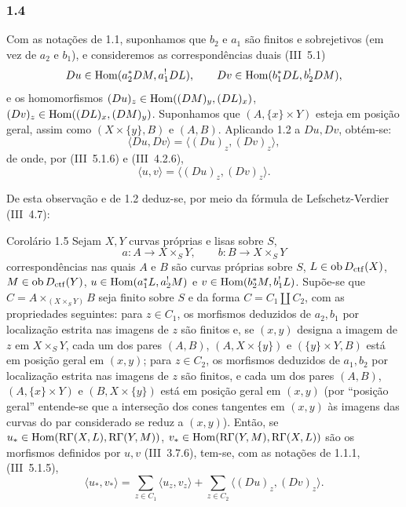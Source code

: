 \subsubsection*{1.4}
Com as notações de 1.1, suponhamos que $b_2$ e $a_1$ são finitos e sobrejetivos (em vez de $a_2$ e $b_1$), e consideremos as correspondências duais (III~5.1)
\[
Du\in\operatorname{Hom}(a_2^*DM,a_1^!DL),\qquad Dv\in\operatorname{Hom}(b_1^*DL,b_2^!DM),
\]
e os homomorfismos $(Du)_z\in\operatorname{Hom}((DM)_y,(DL)_x)$, $(Dv)_z\in\operatorname{Hom}((DL)_x,(DM)_y)$. Suponhamos que $(A,\{x\}\times Y)$ esteja em posição geral, assim como $(X\times\{y\},B)$ e $(A,B)$. Aplicando 1.2 a $Du,Dv$, obtém-se:
\[
\langle Du,Dv\rangle=\langle (Du)_z,(Dv)_z\rangle,
\]
de onde, por (III~5.1.6) e (III~4.2.6),
\begin{equation}\tag{1.4.1}
\langle u,v\rangle=\langle (Du)_z,(Dv)_z\rangle.
\end{equation}

De esta observação e de 1.2 deduz-se, por meio da fórmula de Lefschetz-Verdier (III~4.7):

\begin{statement}{Corolário 1.5}
Sejam $X,Y$ curvas próprias e lisas sobre $S$,
\[
a:A\longrightarrow X\times_S Y,
\qquad
b:B\longrightarrow X\times_S Y
\]
correspondências nas quais $A$ e $B$ são curvas próprias sobre $S$, $L\in\operatorname{ob} D_{\mathrm{ctf}}(X)$, $M\in\operatorname{ob} D_{\mathrm{ctf}}(Y)$, $u\in\operatorname{Hom}(a_1^*L,a_2^!M)$ e $v\in\operatorname{Hom}(b_2^*M,b_1^!L)$. Supõe-se que $C=A\times_{(X\times_S Y)}B$ seja finito sobre $S$ e da forma $C=C_1\amalg C_2$, com as propriedades seguintes: para $z\in C_1$, os morfismos deduzidos de $a_2,b_1$ por localização estrita nas imagens de $z$ são finitos e, se $(x,y)$ designa a imagem de $z$ em $X\times_S Y$, cada um dos pares $(A,B)$, $(A,X\times\{y\})$ e $(\{y\}\times Y,B)$ está em posição geral em $(x,y)$; para $z\in C_2$, os morfismos deduzidos de $a_1,b_2$ por localização estrita nas imagens de $z$ são finitos, e cada um dos pares $(A,B)$, $(A,\{x\}\times Y)$ e $(B,X\times\{y\})$ está em posição geral em $(x,y)$ (por ``posição geral'' entende-se que a interseção dos cones tangentes em $(x,y)$ às imagens das curvas do par considerado se reduz a $(x,y)$). Então, se $u_*\in\operatorname{Hom}(\mathrm{R}\Gamma(X,L),\mathrm{R}\Gamma(Y,M))$, $v_*\in\operatorname{Hom}(\mathrm{R}\Gamma(Y,M),\mathrm{R}\Gamma(X,L))$ são os morfismos definidos por $u,v$ (III~3.7.6), tem-se, com as notações de 1.1.1, (III~5.1.5),
\begin{equation}\tag{1.5.1}
\langle u_*,v_*\rangle=\sum_{z\in C_1}\langle u_z,v_z\rangle+\sum_{z\in C_2}\langle (Du)_z,(Dv)_z\rangle.
\end{equation}
\end{statement}

